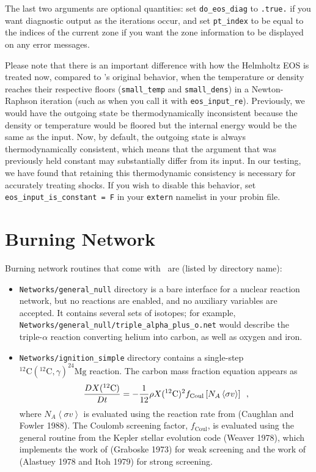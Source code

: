 The last two arguments are optional quantities: set \texttt{do\_eos\_diag} to \texttt{.true.} if you want diagnostic output as the iterations occur, and set \texttt{pt\_index} to be equal to the indices of the current zone if you want the zone information to be displayed on any error messages.

Please note that there is an important difference with how the
Helmholtz EOS is treated now, compared to \castro's original behavior,
when the temperature or density reaches their respective floors
({\tt small\_temp} and {\tt small\_dens}) in a Newton-Raphson
iteration (such as when you call it with
{\tt eos\_input\_re}). Previously, we would have the outgoing state
be thermodynamically inconsistent because the density or temperature
would be floored but the internal energy would be the same as the
input. Now, by default, the outgoing state is always thermodynamically
consistent, which means that the argument that was previously held
constant may substantially differ from its input. In our testing, we
have found that retaining this thermodynamic consistency is necessary
for accurately treating shocks. If you wish to disable this behavior,
set \texttt{eos\_input\_is\_constant = F} in your \texttt{extern}
namelist in your probin file.

\section{Burning Network}
Burning network routines that come with \castro\ are (listed by directory name):
\begin{itemize}
\item {\tt Networks/general\_null} directory is a bare interface for a
  nuclear reaction network, but no reactions are enabled, and no
  auxiliary variables are accepted. It contains several sets of
  isotopes; for example,
  {\tt Networks/general\_null/triple\_alpha\_plus\_o.net} would describe the
  triple-$\alpha$ reaction converting helium into carbon, as well as
  oxygen and iron.
\item {\tt Networks/ignition\_simple} directory contains a single-step
  $^{12}\mathrm{C}(^{12}\mathrm{C},\gamma)^{24}\mathrm{Mg}$ reaction.
  The carbon mass fraction equation appears as
\begin{equation}
\frac{D X(^{12}\mathrm{C})}{Dt} = - \frac{1}{12} \rho X(^{12}\mathrm{C})^2
    f_\mathrm{Coul} \left [N_A \left <\sigma v \right > \right]\enskip,
\end{equation}
where $N_A \left <\sigma v\right>$ is evaluated using the reaction
rate from (Caughlan and Fowler 1988).  The Coulomb screening factor,
$f_\mathrm{Coul}$, is evaluated using the general routine from the
Kepler stellar evolution code (Weaver 1978), which implements the work
of (Graboske 1973) for weak screening and the work of (Alastuey 1978
and Itoh 1979) for strong screening.
\end{itemize}

